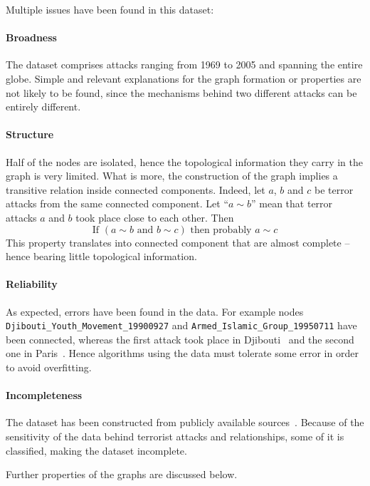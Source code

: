 Multiple issues have been found in this dataset:

\paragraph{Broadness} 
The dataset comprises attacks ranging from 1969 to 2005 and spanning the entire globe. Simple and relevant explanations for the graph formation or properties are not likely to be found, since the mechanisms behind two different attacks can be entirely different.

\paragraph{Structure} 
Half of the nodes are isolated, hence the topological information they carry in the graph is very limited. What is more, the construction of the graph implies a transitive relation inside connected components. Indeed, let $a$, $b$ and $c$ be terror attacks from the same connected component. Let ``$a\sim b$'' mean that terror attacks $a$ and $b$ took place close to each other. Then
\begin{equation}
\text{If } \left ( a \sim b \text{ and } b \sim c \right )  \text{ then probably } a \sim c
\end{equation}
This property translates into connected component that are almost complete -- hence bearing little topological information.

\paragraph{Reliability} 
As expected, errors have been found in the data. For example nodes
 \texttt{Djibouti\_Youth\_Movement\_19900927} 
 and 
 \texttt{Armed\_Islamic\_Group\_19950711} 
 have been connected, whereas the first attack took place in Djibouti~\cite{amnesty1991} and the second one in Paris~\cite{nouvelObs2007}. Hence algorithms using the data must tolerate some error in order to avoid overfitting.

\paragraph{Incompleteness}
The dataset has been constructed from publicly available sources~\cite{ZSG2006}. Because of the sensitivity of the data behind terrorist attacks and relationships, some of it is classified, making the dataset incomplete.

Further properties of the graphs are discussed below.


